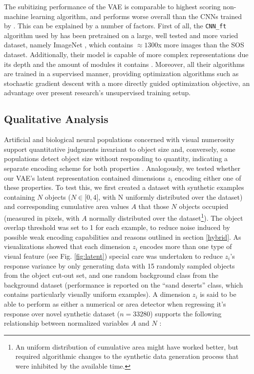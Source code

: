 \documentclass[twocolumn]{article}
\begin{document}

The subitizing performance of the VAE is comparable to highest scoring
non-machine learning algorithm, and performs worse overall than the CNNs
trained by \citet{zhang2016salient}. This can be explained by a number
of factors. First of all, the \texttt{CNN\_ft} algorithm used by
\citet{zhang2016salient} has been pretrained on a large, well tested and
more varied dataset, namely ImageNet \citep{russakovsky2015imagenet},
which contains \(\approx 1300\)x more images than the SOS dataset. Additionally, their model
is capable of more complex representations due its depth and the amount
of modules it contains \citep[the applied model from][ uses 22 compared
to the 12 in our approach]{szegedy2015going}. Moreover, all their
algorithms are trained in a supervised manner, providing optimization
algorithms such as stochastic gradient descent with a more directly
guided optimization objective, an advantage over present research's
unsupervised training setup.

\hypertarget{qualitative-analysis}{%
\subsection{Qualitative Analysis}\label{qualitative-analysis}}

Artificial and biological neural populations concerned with visual
numerosity support quantitative judgments invariant to object size and,
conversely, some populations detect object size without responding to
quantity, indicating a separate encoding scheme for both properties
\citep{stoianov2012, harvey2013topographic}. Analogously, we tested
whether our VAE's latent representation contained dimensions \(z_i\)
encoding either one of these properties. To test this, we first created
a dataset with synthetic examples containing \(N\) objects
(\(N \in \lbrack 0, 4\rbrack\), with N uniformly distributed over the
dataset) and corresponding cumulative area values \(A\) that those \(N\)
objects occupied (measured in pixels, with \(A\) normally distributed
over the dataset\footnote{An uniform distribution of cumulative area
  might have worked better, but required algorithmic changes to the
  synthetic data generation process that were inhibited by the available time.}). The object overlap threshold was set to 1 for
each example, to reduce noise induced by possible weak encoding
capabilities and reasons outlined in section
\ref{hybrid}. As visualizations showed that each dimension \(z_i\) encodes more
than one type of visual feature (see Fig. \ref{fig:latent}) special care was
undertaken to reduce \(z_i\)'s response variance by only generating data
with 15 randomly sampled objects from the object cut-out set, and one
random background class from the background dataset (performance is
reported on the ``sand deserts'' class, which contains particularly
visually uniform examples). A dimension \(z_i\) is said to be able to
perform as either a numerical or area detector when regressing it's
response over novel synthetic dataset (\(n=33280\)) supports the
following relationship between normalized variables \(A\) and \(N\)
\citep{stoianov2012}:
\end{document}
